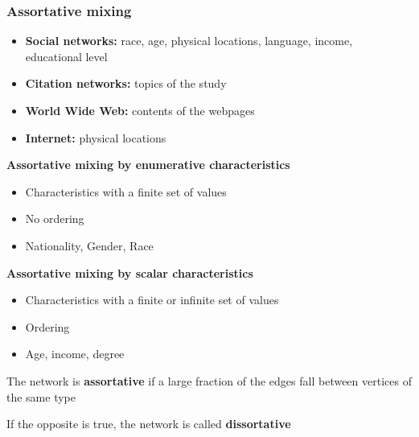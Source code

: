\documentclass{beamer}
\begin{document}
\begin{frame}
    \frametitle{Assortative mixing}
        \begin{itemize}
        \setlength\itemsep{1em}
            \item{{\bf Social networks:} race, age, physical locations, language, income, educational level}
            \item{{\bf Citation networks:} topics of the study}
            \item{{\bf World Wide Web:} contents of the webpages}
            \item{{\bf Internet:} physical locations}
        \end{itemize}
\end{frame}
\begin{frame}
    \centering
        \vspace{1em}
    {\bf Assortative mixing by enumerative characteristics}
        \begin{itemize}
        \setlength\itemsep{1em}
            \item{Characteristics with a finite set of values} 
            \item{No ordering} 
            \item{Nationality, Gender, Race} 
        \end{itemize}
        \vspace{1em}
    {\bf Assortative mixing by scalar characteristics}
        \begin{itemize}
        \setlength\itemsep{1em}
            \item{Characteristics with a finite or infinite set of values}
            \item{Ordering}
            \item{Age, income, degree}
        \end{itemize}
        \pause
        \vspace{1em}
        The network is {\bf assortative} if a large fraction of the edges fall between vertices of the same type

        \vspace{1em}
        If the opposite is true, the network is called {\bf dissortative}
\end{frame}
\end{document}
